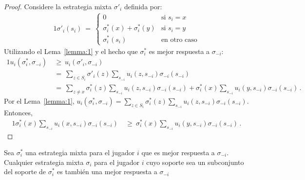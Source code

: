 \begin{proof}
Considere la estrategia mixta $\sigma'_i$ definida por:
\begin{alignat}{1}
	\sigma'_{i}(s_i)\ =\  
	\begin{cases}
		0 &  \text{si } s_i = x \\
		\sigma^*_i(x) + \sigma^*_i(y) & \text{si } s_i = y \\
		\sigma^*_i(s_i) & \text{en otro caso} 
	\end{cases}
\end{alignat}
Utilizando el Lema~\ref{lemma:1} y el hecho que $\sigma^*_i$ es mejor respuesta a $\sigma_{-i}$:
\begin{alignat}{1}
  u_i(\sigma^*_i, \sigma_{-i})\ 
    &\geq\ u_i(\sigma'_i, \sigma_{-i}) \\
    &=\ \sum_{z \in S_i} \sigma'_i(z) \sum_{s_{-i}} u_i(z,s_{-i}) \sigma_{-i}(s_{-i}) \\
    &=\ \sum_{z\neq x} \sigma^*_i(z) \sum_{s_{-i}} u_i(z,s_{-i}) \sigma_{-i}(s_{-i}) + \sigma^*_i(x)\sum_{s_{-i}} u_i(y,s_{-i})\sigma_{-i}(s_{-i}) \,.
\end{alignat}
Por el Lema~\ref{lemma:1},
$u_i(\sigma^*_i, \sigma_{-i})=\sum_{z \in S_i} \sigma^*_i(z) \sum_{s_{-i}} u_i(z,s_{-i}) \sigma_{-i}(s_{-i})$. Entonces,
\begin{alignat}{1}
  \label{eq:ineq-ganancias}
  \sigma^*_i(x) \sum_{s_{-i}} u_i(x,s_{-i}) \sigma_{-i}(s_{-i})\
    &\geq\ \sigma^*_i(x)\sum_{s_{-i}} u_i(y,s_{-i}) \sigma_{-i}(s_{-i}) \,.
\end{alignat}
\end{proof}

\begin{theorem}
\label{theo:mejor-respuesta}
Sea $\sigma^*_i$ una estrategia mixta para el jugador $i$ que es mejor respuesta a $\sigma_{-i}$. Cualquier estrategia mixta $\sigma_i$ para el jugador $i$ cuyo soporte sea un subconjunto del soporte de $\sigma^*_i$ es también una mejor respuesta a $\sigma_{-i}$
\end{theorem}

